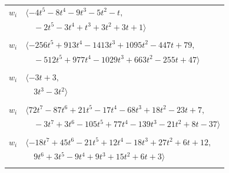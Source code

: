 \documentclass[11pt]{article}
\begin{document}
\begin{longtable}{@{}ll@{}}
$w_i$ & $\langle -4t^{5}-8t^{4}-9t^{3}-5t^{2}-t,$\\
 & $\quad -2t^{5}-3t^{4}+t^{3}+3t^{2}+3t+1\rangle$\\
\addlinespace[2pt]
\multicolumn{2}{@{}p{0.97\textwidth}@{}}{$i=49$, $D_i=8$, $\rho_{ij}$: $11{:}1, \allowbreak 15{:}1, \allowbreak 16{:}1, \allowbreak 22{:}2, \allowbreak 28{:}2, \allowbreak 31{:}2, \allowbreak 32{:}1, \allowbreak 39{:}1, \allowbreak 41{:}2, \allowbreak 45{:}1, \allowbreak 46{:}2, \allowbreak 57{:}1, \allowbreak 61{:}1, \allowbreak 64{:}2, \allowbreak 67{:}1$}\\
$w_i$ & $\langle -256t^{5}+913t^{4}-1413t^{3}+1095t^{2}-447t+79,$\\
 & $\quad -512t^{5}+977t^{4}-1029t^{3}+663t^{2}-255t+47\rangle$\\
\addlinespace[2pt]
\multicolumn{2}{@{}p{0.97\textwidth}@{}}{$i=50$, $D_i=1$, $\rho_{ij}$: $0{:}1, \allowbreak 6{:}1, \allowbreak 9{:}1, \allowbreak 10{:}2, \allowbreak 11{:}2, \allowbreak 58{:}1$}\\
$w_i$ & $\langle -3t+3,$\\
 & $\quad 3t^{3}-3t^{2}\rangle$\\
\addlinespace[2pt]
\multicolumn{2}{@{}p{0.97\textwidth}@{}}{$i=51$, $D_i=3$, $\rho_{ij}$: $10{:}2, \allowbreak 12{:}1, \allowbreak 14{:}1, \allowbreak 15{:}1, \allowbreak 26{:}2, \allowbreak 30{:}2, \allowbreak 34{:}1, \allowbreak 35{:}1, \allowbreak 38{:}2, \allowbreak 42{:}2, \allowbreak 47{:}2, \allowbreak 52{:}1, \allowbreak 59{:}1$}\\
$w_i$ & $\langle 72t^{7}-87t^{6}+21t^{5}-17t^{4}-68t^{3}+18t^{2}-23t+7,$\\
 & $\quad -3t^{7}+3t^{6}-105t^{5}+77t^{4}-139t^{3}-21t^{2}+8t-37\rangle$\\
\addlinespace[2pt]
\multicolumn{2}{@{}p{0.97\textwidth}@{}}{$i=52$, $D_i=9$, $\rho_{ij}$: $3{:}2, \allowbreak 8{:}2, \allowbreak 9{:}1, \allowbreak 11{:}2, \allowbreak 12{:}1, \allowbreak 29{:}1, \allowbreak 51{:}2, \allowbreak 53{:}1, \allowbreak 58{:}1, \allowbreak 67{:}2$}\\
$w_i$ & $\langle -18t^{7}+45t^{6}-21t^{5}+12t^{4}-18t^{3}+27t^{2}+6t+12,$\\
 & $\quad 9t^{6}+3t^{5}-9t^{4}+9t^{3}+15t^{2}+6t+3\rangle$\\
\addlinespace[2pt]
\multicolumn{2}{@{}p{0.97\textwidth}@{}}{$i=53$, $D_i=16$, $\rho_{ij}$: $3{:}2, \allowbreak 12{:}2, \allowbreak 13{:}1, \allowbreak 16{:}1, \allowbreak 19{:}1, \allowbreak 21{:}2, \allowbreak 24{:}1, \allowbreak 26{:}1, \allowbreak 36{:}1, \allowbreak 47{:}2, \allowbreak 52{:}2, \allowbreak 54{:}1, \allowbreak 55{:}1, \allowbreak 63{:}2, \allowbreak 70{:}1$}\\

\end{longtable}
\end{document}
